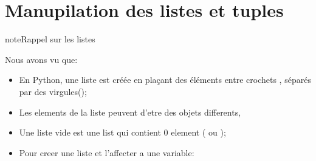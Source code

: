 \documentclass[letterpaper,10pt,french]{sphinxmanual}
\begin{document}
\section{Manupilation des listes et tuples}
\label{\detokenize{ch4:manupilation-des-listes-et-tuples}}\label{\detokenize{ch4::doc}}
\begin{sphinxadmonition}{note}{Rappel sur les listes}

\sphinxAtStartPar
Nous avons vu que:
\begin{itemize}
\item {} 
\sphinxAtStartPar
En Python, une liste est créée en plaçant des éléments entre crochets \sphinxcode{\sphinxupquote{{[}{]}}} , séparés par des virgules(\sphinxcode{\sphinxupquote{,}});

\item {} 
\sphinxAtStartPar
Les elements de la liste peuvent d’etre des objets differents,

\item {} 
\sphinxAtStartPar
Une liste vide est une list qui contient 0 element (\sphinxcode{\sphinxupquote{{[}{]}}} ou );

\item {} 
\sphinxAtStartPar
Pour creer une liste et l’affecter a une variable:

\end{itemize}

\begin{sphinxVerbatim}[commandchars=\\\{\}]
  \PYG{p}{[}   \PYG{p}{]}
\end{sphinxVerbatim}
\end{sphinxadmonition}
\end{document}
